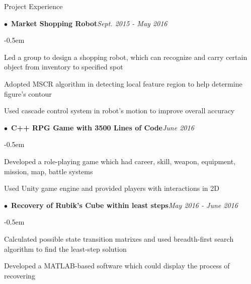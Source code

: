 \documentclass{resume} %
\begin{document}
\begin{rSection}{Project Experience}
\begin{spacing}{0.4}
$\bullet$~{\bf Market Shopping Robot}\hfill{\em Sept. 2015 - May 2016}\smallskip\\
\end{spacing}
\begin{list}{--}{\leftmargin=1em}
	\itemsep -0.5em \vspace{-0.5em}
\item Led a group to design a shopping robot, which can recognize and carry certain object from inventory to specified spot
\item Adopted MSCR algorithm in detecting local feature region to help determine figure’s contour
\item Used cascade control system in robot’s motion to improve overall accuracy

\end{list}

\begin{spacing}{0.4}
$\bullet$~{\bf C++ RPG Game with 3500 Lines of Code}\hfill{\em June 2016}\smallskip\\
\end{spacing}
\begin{list}{--}{\leftmargin=1em}
	\itemsep -0.5em \vspace{-0.5em}
\item Developed a role-playing game which had career, skill, weapon, equipment, mission, map, battle systems
\item Used Unity game engine and provided players with interactions in 2D

\end{list}
	
\begin{spacing}{0.4}
$\bullet$~{\bf Recovery of Rubik's Cube within least steps}\hfill{\em May 2016 - June 2016}\smallskip\\
\end{spacing}
\begin{list}{--}{\leftmargin=1em}
	\itemsep -0.5em \vspace{-0.5em}
\item Calculated possible state transition matrixes and used breadth-first search algorithm to find the least-step solution
\item Developed a MATLAB-based software which could display the process of recovering

\end{list}
\end{rSection}
\end{document}
